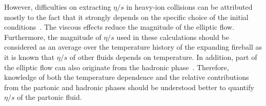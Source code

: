 However, difficulties on extracting $\eta/s$ in heavy-ion collisions can be attributed mostly to the fact that it strongly depends on the specific choice of the initial conditions~\cite{Romatschke:2007mq,Luzum:2012wu,Shen:2011zc}.
The viscous effects reduce the magnitude of the elliptic flow. Furthermore, the magnitude of $\eta/s$ used in these calculations should be considered as an average over the temperature history of the expanding fireball as it is known that $\eta/s$ of other fluids depends on temperature. 
In addition, part of the elliptic flow can also originate from the hadronic phase~\cite{Bozek:2011ua,Rose:2014fba,Ryu:2015vwa}. Therefore,
knowledge of both the temperature dependence and the relative contributions from the partonic and hadronic phases should be understood better to quantify $\eta/s$ of the partonic fluid.

